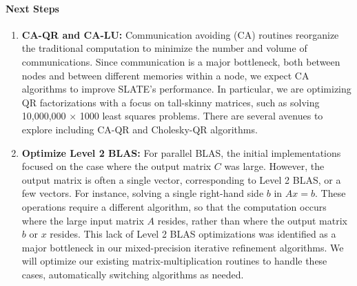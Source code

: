 \paragraph{Next Steps}

\begin{enumerate}

\item \textbf{CA-QR and CA-LU:}
Communication avoiding (CA) routines reorganize the traditional computation
to minimize the number and volume of communications.
Since communication is a major
bottleneck, both between nodes and between different memories within a node,
we expect CA algorithms to improve SLATE's performance.
In particular, we are optimizing QR factorizations with a focus on tall-skinny
matrices, such as solving 10,000,000 $\times$ 1000
least squares problems. There are several avenues to explore including
CA-QR and Cholesky-QR algorithms.

\item \textbf{Optimize Level 2 BLAS:}
For parallel BLAS, the initial implementations focused on the case where
the output matrix $C$ was large. However, the output matrix is often a
single vector, corresponding to Level 2 BLAS, or a few vectors.
For instance, solving a
single right-hand side $b$ in $Ax = b$. These operations require a different
algorithm, so that the computation occurs where the large input matrix $A$
resides, rather than where the output matrix $b$ or $x$ resides. This
lack of Level 2 BLAS optimizations was identified as a major bottleneck
in our mixed-precision iterative refinement algorithms. We will optimize
our existing matrix-multiplication routines to handle these cases,
automatically switching algorithms as needed.

\end{enumerate}
